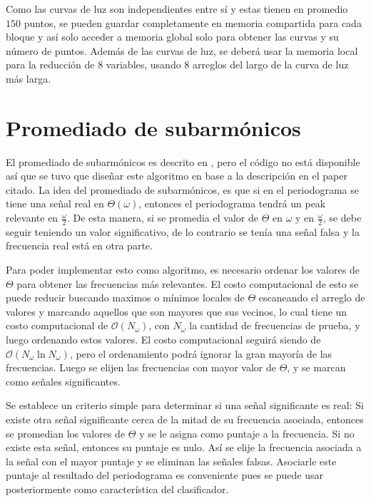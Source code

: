 Como las curvas de luz son independientes entre sí y estas tienen en promedio $150$ puntos, se pueden guardar completamente en memoria compartida para cada bloque y así solo acceder a memoria global solo para obtener las curvas y su número de puntos. Además de las curvas de luz, se deberá usar la memoria local para la reducción de 8 variables, usando 8 arreglos del largo de la curva de luz más larga. 

\section{Promediado de subarmónicos}\label{sec:subarmonicos-diseno}
El promediado de subarmónicos es descrito en \cite{graham-entropy}, pero el código no está disponible así que se tuvo que diseñar este algoritmo en base a la descripción en el paper citado. La idea del promediado de subarmónicos, es que si en el periodograma se tiene una señal real en $\Theta(\omega)$, entonces el periodograma tendrá un peak relevante en $\frac{\omega}{2}$. De esta manera, si se promedia el valor de $\Theta$ en $\omega$ y en $\frac{\omega}{2}$, se debe seguir teniendo un valor significativo, de lo contrario se tenía una señal falsa y la frecuencia real está en otra parte.

Para poder implementar esto como algoritmo, es necesario ordenar los valores de $\Theta$ para obtener las frecuencias más relevantes. El costo computacional de esto se puede reducir buscando maximos o mínimos locales de $\Theta$ escaneando el arreglo de valores y marcando aquellos que son mayores que sus vecinos, lo cual tiene un costo computacional de $\mathcal O(N_\omega)$, con $N_\omega$ la cantidad de frecuencias de prueba, y luego ordenando estos valores. El costo computacional seguirá siendo de $\mathcal O (N_\omega \ln N_\omega)$, pero el ordenamiento podrá ignorar la gran mayoría de las frecuencias. Luego se elijen las frecuencias con mayor valor de $\Theta$, y se marcan como señales significantes.

Se establece un criterio simple para determinar si una señal significante es real: Si existe otra señal significante cerca de la mitad de su frecuencia asociada, entonces se promedian los valores de $\Theta$ y se le asigna como puntaje a la frecuencia. Si no existe esta señal, entonces su puntaje es nulo. Así se elije la frecuencia asociada a la señal con el mayor puntaje y se eliminan las señales falsas. Asociarle este puntaje al resultado del periodograma es conveniente pues se puede usar posteriormente como característica del clasificador.


